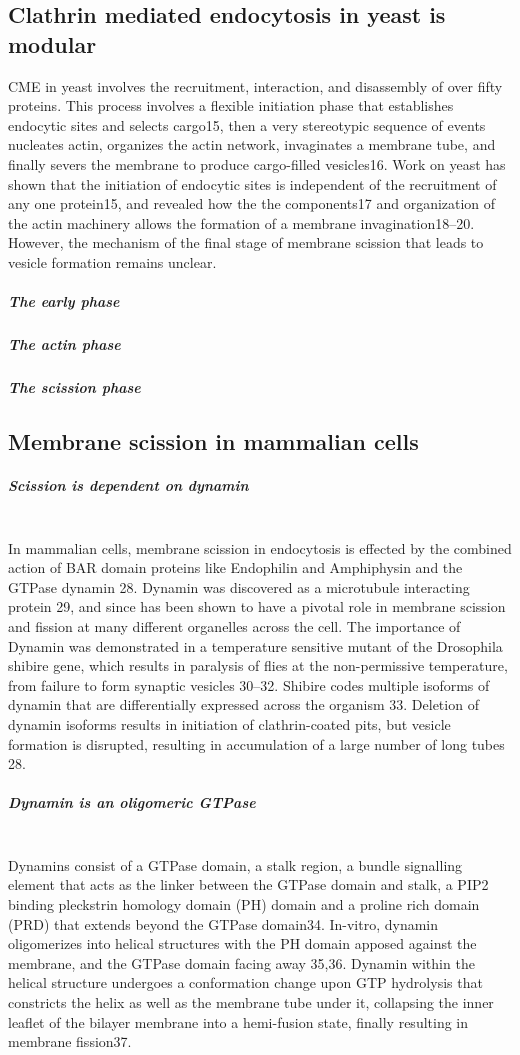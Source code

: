 		\subsection{Clathrin mediated endocytosis in yeast is modular}
	CME in yeast involves the recruitment, interaction, and disassembly of over fifty proteins. This process involves a flexible initiation phase that establishes endocytic sites and selects cargo15, then a very stereotypic sequence of events nucleates actin, organizes the actin network, invaginates a membrane tube, and finally severs the membrane to produce cargo-filled vesicles16. Work on yeast has shown that the initiation of endocytic sites is independent of the recruitment of any one protein15, and revealed how the the components17 and organization of the actin machinery allows the formation of a membrane invagination18–20. However, the mechanism of the final stage of membrane scission that leads to vesicle formation remains unclear.

		\subparagraph{The early phase}
		\subparagraph{The actin phase}
		\subparagraph{The scission phase}
		
		
	\subsection{Membrane scission in mammalian cells}
		\subparagraph{Scission is dependent on dynamin} 
\mbox{} \\
		 In mammalian cells, membrane scission in endocytosis is effected by the combined action of BAR domain proteins like Endophilin and Amphiphysin and the GTPase dynamin 28.  Dynamin was discovered as a microtubule interacting protein 29, and since has been shown to have a pivotal role in membrane scission and fission at many different organelles across the cell. The importance of Dynamin was demonstrated in a temperature sensitive mutant of the Drosophila shibire gene, which results in paralysis of flies at the non-permissive temperature, from failure to form synaptic vesicles 30–32. Shibire codes multiple isoforms of dynamin that are differentially expressed across the organism 33. Deletion of dynamin isoforms results in initiation of clathrin-coated pits, but vesicle formation is disrupted, resulting in accumulation of a large number of long tubes 28. 

		 
		\subparagraph{Dynamin is an oligomeric GTPase}
\mbox{} \\ 
Dynamins consist of a GTPase domain, a stalk region, a bundle signalling element that acts as the linker between the GTPase domain and stalk, a PIP2 binding pleckstrin homology domain (PH) domain and a proline rich domain (PRD) that extends beyond the GTPase domain34. In-vitro, dynamin oligomerizes into helical structures with the PH domain apposed against the membrane, and the GTPase domain facing away 35,36. Dynamin within the helical structure undergoes a conformation change upon GTP hydrolysis that constricts the helix as well as the membrane tube under it, collapsing the inner leaflet of the bilayer membrane into a hemi-fusion state, finally resulting in membrane fission37.

